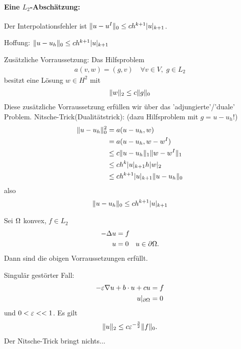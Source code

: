 \paragraph{Eine $L_2$-Abschätzung:} Der Interpolationsfehler ist $\|u-u^I\|_0 \leq c h^{k+1} |u|_{k+1}$.

Hoffung: $\|u-u_h\|_0 \leq c h^{k+1} |u|_{k+1}$

Zusätzliche Vorraussetzung: Das Hilfsproblem
\begin{align*}
  a(v, w) = (g, v) \quad \forall v \in V, \; g \in L_2
\end{align*}
besitzt eine Lösung $w \in H^2$ mit 
\begin{align*}
  \|w\|_2 \leq c \|g\| _0
\end{align*}
Diese zusätzliche Vorraussetzung erfüllen wir über das 'adjungierte'/'duale' Problem.
Nitsche-Trick(Dualitätstrick): (dazu Hilfsproblem mit $g = u -u_h$!) 
\begin{align*}
  \|u - u_h\|_0^2 &= a(u - u_h, w) \\
& = a(u-u_h, w - w^I)\\
&\leq c \|u - u_h\|_1 \|w - w^I\|_1\\
&\leq c h^k |u|_{k +1} h |w|_2\\
&\leq c h^{k+1} |u|_{k+1}\|u - u_h\|_0
\end{align*}
also 
\begin{align*}
  \|u - u_h\|_0 \leq c h^{k +1}|u|_{k+1}
\end{align*}
\begin{beispiel}
  Sei $\Omega$ konvex, $f \in L_2$
  \begin{align*}
    - \Delta u &= f\\
    u &= 0 \quad u \in \partial \Omega.
  \end{align*}
Dann sind die obigen Vorraussetzungen erfüllt.
\end{beispiel}
\begin{beispiel}
  Singulär gestörter Fall:
  \begin{align*}
    - \varepsilon \nabla u + b \cdot u + cu &= f\\
u|_{\partial \Omega} &= 0
  \end{align*}
und $0< \varepsilon<<1$. Es gilt
\begin{align*}
  \|u\|_2 \leq c\varepsilon^{- \frac 3 2} \|f\|_0.
\end{align*}
Der Nitsche-Trick bringt nichts...
\end{beispiel}

